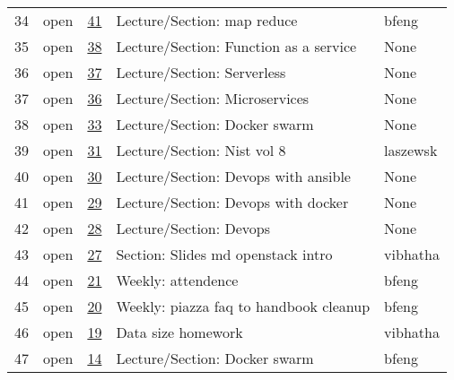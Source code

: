 \begin{center}
\begin{longtable}{lllll}
34 & open & \href{https://github.com/cloudmesh/book/issues/41}{41} & Lecture/Section: map reduce & bfeng\\
35 & open & \href{https://github.com/cloudmesh/book/issues/38}{38} & Lecture/Section: Function as a service & None\\
36 & open & \href{https://github.com/cloudmesh/book/issues/37}{37} & Lecture/Section: Serverless & None\\
37 & open & \href{https://github.com/cloudmesh/book/issues/36}{36} & Lecture/Section: Microservices & None\\
38 & open & \href{https://github.com/cloudmesh/book/issues/33}{33} & Lecture/Section: Docker swarm & None\\
39 & open & \href{https://github.com/cloudmesh/book/issues/31}{31} & Lecture/Section: Nist vol 8 & laszewsk\\
40 & open & \href{https://github.com/cloudmesh/book/issues/30}{30} & Lecture/Section: Devops with ansible & None\\
41 & open & \href{https://github.com/cloudmesh/book/issues/29}{29} & Lecture/Section: Devops with docker & None\\
42 & open & \href{https://github.com/cloudmesh/book/issues/28}{28} & Lecture/Section: Devops & None\\
43 & open & \href{https://github.com/cloudmesh/book/issues/27}{27} & Section: Slides md openstack intro & vibhatha\\
44 & open & \href{https://github.com/cloudmesh/book/issues/21}{21} & Weekly: attendence & bfeng\\
45 & open & \href{https://github.com/cloudmesh/book/issues/20}{20} & Weekly: piazza faq to handbook cleanup & bfeng\\
46 & open & \href{https://github.com/cloudmesh/book/issues/19}{19} & Data size homework & vibhatha\\
47 & open & \href{https://github.com/cloudmesh/book/issues/14}{14} & Lecture/Section: Docker swarm & bfeng\\
\end{longtable}
\end{center}
